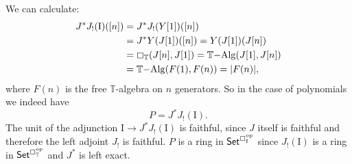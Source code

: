 \documentclass[11pt]{amsart}
\newcommand{\C}{\ensuremath{\boxempty}}
\newcommand{\T}{\ensuremath{\mathbb{T}}}
\newcommand{\psh}[1]{\ensuremath{\mathsf{Set}^{#1^{\mathrm{op}}}}}
\renewcommand{\to}{\ensuremath{\rightarrow}}
\newcommand{\I}{\ensuremath{\mathrm{I}}}
\theoremstyle{remark}
\theoremstyle{definition}
\begin{document}
We can calculate:
\begin{equation}
\begin{split}
J^* J_! ( \I )( [n] ) &= J^* J_! ( Y[1] )( [n] )\\
 &= J^* Y( J[1] )( [n] ) = Y( J[1] )( J[n] ) \\
 &= \C_\T( J[n] , J[1] ) = \T\mathrm{-Alg}( J[1] , J[n] ) \\
 &= \T\mathrm{-Alg}( F(1) , F(n) ) = | F(n) |,
\end{split}
\end{equation}
where $F(n)$ is the free $\T$-algebra on $n$ generators.  So in the case of polynomials we indeed have 
$$P = J^* J_! ( \I ).$$
The unit of the adjunction $\I \to J^* J_! ( \I )$ is faithful, since $J$ itself is faithful and therefore the left adjoint $J_!$ is faithful.
$P$ is a ring in $\psh{\C_\I}$ since $J_!(\I)$ is a ring in $\psh{\C_\T}$ and $J^*$ is left exact.
%



%
\end{document}
